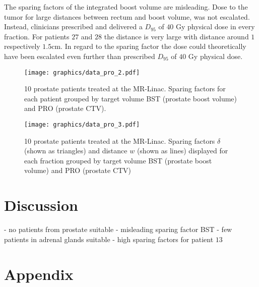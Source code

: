 \documentclass[\relativeRoot/ada.tex]{subfiles}
\begin{document}
The sparing factors of the integrated boost volume are misleading. Dose to the tumor for large distances between rectum and boost volume, was not escalated. Instead, clinicians prescribed and delivered a $D_{95}$ of $40$ Gy physical dose in every fraction. For patients $27$ and $28$ the distance is very large with distance around $1$ respectively $1.5$cm. In regard to the sparing factor the dose could theoretically have been escalated even further than prescribed $D_{95}$ of $40$ Gy physical dose.

\begin{figure}[!htb]
    \centering
    \texttt{[image: graphics/data\_pro\_2.pdf]}
    \caption{10 prostate patients treated at the MR-Linac. Sparing factors for each patient grouped by target volume BST (prostate boost volume) and PRO (prostate CTV).}
    \label{fig:data_pro_2}
\end{figure}

\begin{figure}[!htb]
    \centering
    \texttt{[image: graphics/data\_pro\_3.pdf]}
    \caption{10 prostate patients treated at the MR-Linac. Sparing factors $\delta$ (shown as triangles) and distance $w$ (shown as lines) displayed for each fraction grouped by target volume BST (prostate boost volume) and PRO (prostate CTV)}
    \label{fig:data_pro_3}
\end{figure}

\section{Discussion}

- no patients from prostate suitable
- misleading sparing factor BST
- few patients in adrenal glands suitable
- high sparing factors for patient $13$



\clearpage
\newpage

\printbibliography{}

\newpage

\section*{Appendix}

%


\renewcommand{\thesubsection}{\Alph{subsection}}
\renewcommand\thefigure{\thesubsection.\arabic{figure}}

\setcounter{figure}{0}
\setcounter{subsection}{0}
\end{document}

